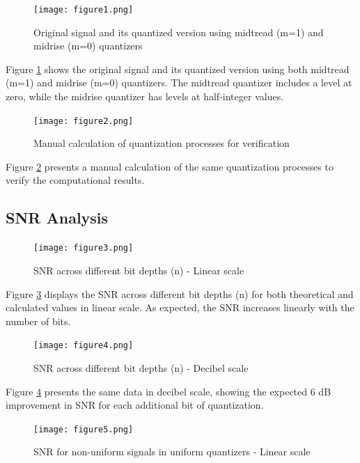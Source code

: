 \documentclass{article}
\begin{document}
\begin{figure}[H]
    \centering
    \texttt{[image: figure1.png]}
    \caption{Original signal and its quantized version using midtread (m=1) and midrise (m=0) quantizers}
    \label{fig:midtread_midrise}
\end{figure}

Figure \ref{fig:midtread_midrise} shows the original signal and its quantized version using both midtread (m=1) and midrise (m=0) quantizers. The midtread quantizer includes a level at zero, while the midrise quantizer has levels at half-integer values.

\begin{figure}[H]
    \centering
    \texttt{[image: figure2.png]}
    \caption{Manual calculation of quantization processes for verification}
    \label{fig:manual_calc}
\end{figure}

Figure \ref{fig:manual_calc} presents a manual calculation of the same quantization processes to verify the computational results.

\subsection{SNR Analysis}

\begin{figure}[H]
    \centering
    \texttt{[image: figure3.png]}
    \caption{SNR across different bit depths (n) - Linear scale}
    \label{fig:snr_linear}
\end{figure}

Figure \ref{fig:snr_linear} displays the SNR across different bit depths (n) for both theoretical and calculated values in linear scale. As expected, the SNR increases linearly with the number of bits.

\begin{figure}[H]
    \centering
    \texttt{[image: figure4.png]}
    \caption{SNR across different bit depths (n) - Decibel scale}
    \label{fig:snr_db}
\end{figure}

Figure \ref{fig:snr_db} presents the same data in decibel scale, showing the expected 6 dB improvement in SNR for each additional bit of quantization.

\begin{figure}[H]
    \centering
    \texttt{[image: figure5.png]}
    \caption{SNR for non-uniform signals in uniform quantizers - Linear scale}
    \label{fig:nonuniform_linear}
\end{figure}
\end{document}
